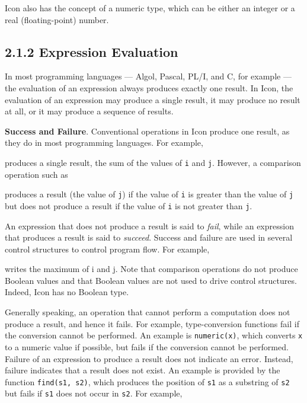 Icon also has the concept of a numeric type, which can be either an
integer or a real (floating-point) number.


\subsection[2.1.2 Expression Evaluation]{2.1.2 Expression Evaluation}

In most programming languages --- Algol, Pascal, PL/I, and C, for
example --- the evaluation of an expression always produces exactly
one result. In Icon, the evaluation of an expression may produce a
single result, it may produce no result at all, or it may produce a
sequence of results.

\textbf{Success and Failure}. Conventional operations in Icon
produce one result, as they do in most programming languages. For
example,


\noindent produces a single result, the sum of the values of \texttt{i} and
\texttt{j}. However, a comparison operation such as


\noindent produces a result (the value of \texttt{j}) if the value of
\texttt{i} is greater than the value of \texttt{j} but does not produce
a result if the value of \texttt{i} is not greater than \texttt{j}.

An expression that does not produce a result is said to \textit{fail},
while an expression that produces a result is said to
\textit{succeed}. Success and failure are used in several control
structures to control program flow. For example,


\noindent writes the maximum of i and j. Note that comparison
operations do not produce Boolean values and that Boolean values are
not used to drive control structures. Indeed, Icon has no Boolean
type.

Generally speaking, an operation that cannot perform a computation
does not produce a result, and hence it fails. For example,
type-conversion functions fail if the conversion cannot be
performed. An example is \texttt{numeric(x)}, which converts
\texttt{x} to a numeric value if possible, but fails if the conversion
cannot be performed. Failure of an expression to produce a result does
not indicate an error. Instead, failure indicates that a result does
not exist. An example is provided by the function \texttt{find(s1, s2)},
which produces the position of \texttt{s1} as a substring of \texttt{s2}
but fails if \texttt{s1} does not occur in \texttt{s2}.  For example,

